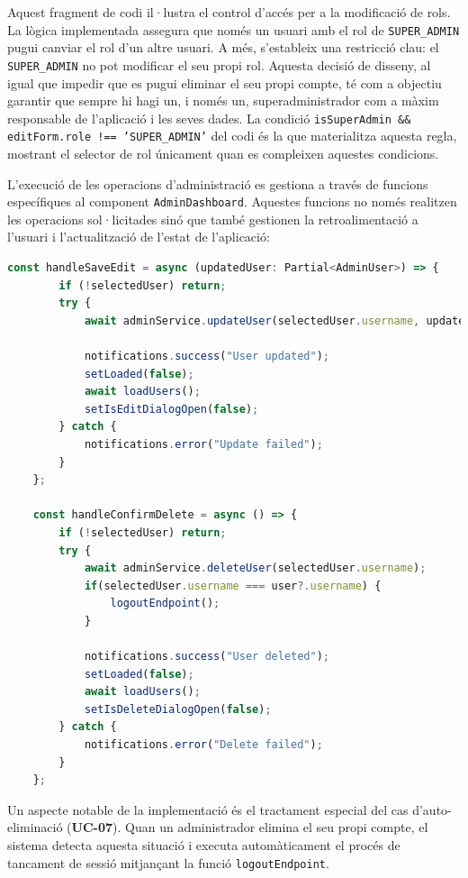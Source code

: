 Aquest fragment de codi il·lustra el control d'accés per a la modificació de rols. La lògica implementada assegura que només un usuari amb el rol de \texttt{SUPER\_ADMIN} pugui canviar el rol d'un altre usuari. A més, s'estableix una restricció clau: el \texttt{SUPER\_ADMIN} no pot modificar el seu propi rol. Aquesta decisió de disseny, al igual que impedir que es pugui eliminar el seu propi compte, té com a objectiu garantir que sempre hi hagi un, i només un, superadministrador com a màxim responsable de l'aplicació i les seves dades. La condició \texttt{isSuperAdmin \&\& editForm.role !== 'SUPER\_ADMIN'} del codi és la que materialitza aquesta regla, mostrant el selector de rol únicament quan es compleixen aquestes condicions.

L'execució de les operacions d'administració es gestiona a través de funcions específiques al component \texttt{AdminDashboard}. Aquestes funcions no només realitzen les operacions sol·licitades sinó que també gestionen la retroalimentació a l'usuari i l'actualització de l'estat de l'aplicació:

\begin{lstlisting}[language=javascript, caption={Gestió d'operacions administratives}]
    const handleSaveEdit = async (updatedUser: Partial<AdminUser>) => {
        if (!selectedUser) return;
        try {
            await adminService.updateUser(selectedUser.username, updatedUser);
            
            notifications.success("User updated");
            setLoaded(false);
            await loadUsers();
            setIsEditDialogOpen(false);
        } catch {
            notifications.error("Update failed");
        }
    };

    const handleConfirmDelete = async () => {
        if (!selectedUser) return;
        try {
            await adminService.deleteUser(selectedUser.username);
            if(selectedUser.username === user?.username) {
                logoutEndpoint();
            }
            
            notifications.success("User deleted");
            setLoaded(false);
            await loadUsers(); 
            setIsDeleteDialogOpen(false);
        } catch {
            notifications.error("Delete failed");
        }
    };
\end{lstlisting}

Un aspecte notable de la implementació és el tractament especial del cas d'auto-eliminació (\textbf{UC-07}). Quan un administrador elimina el seu propi compte, el sistema detecta aquesta situació i executa automàticament el procés de tancament de sessió mitjançant la funció \texttt{logoutEndpoint}.


